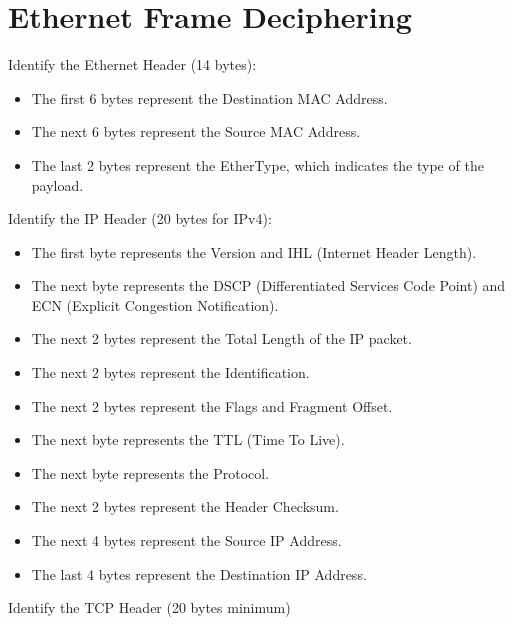 \documentclass{article}
\begin{document}
\section{\textbf{Ethernet Frame Deciphering}}
\begin{flushleft}
    Identify the Ethernet Header (14 bytes):

    \begin{itemize}
        \item The first 6 bytes represent the Destination MAC Address.
        \item The next 6 bytes represent the Source MAC Address.
        \item The last 2 bytes represent the EtherType, which indicates the type of the payload.

    \end{itemize}
        
    Identify the IP Header (20 bytes for IPv4):

    \begin{itemize}
        \item The first byte represents the Version and IHL (Internet Header Length).
        \item The next byte represents the DSCP (Differentiated Services Code Point) and ECN (Explicit Congestion Notification).
        \item The next 2 bytes represent the Total Length of the IP packet.
        \item The next 2 bytes represent the Identification.
        \item The next 2 bytes represent the Flags and Fragment Offset.
        \item The next byte represents the TTL (Time To Live).
        \item The next byte represents the Protocol.
        \item The next 2 bytes represent the Header Checksum.
        \item The next 4 bytes represent the Source IP Address.
        \item The last 4 bytes represent the Destination IP Address.
    \end{itemize}

    Identify the TCP Header (20 bytes minimum)


\end{flushleft}
\end{document}
